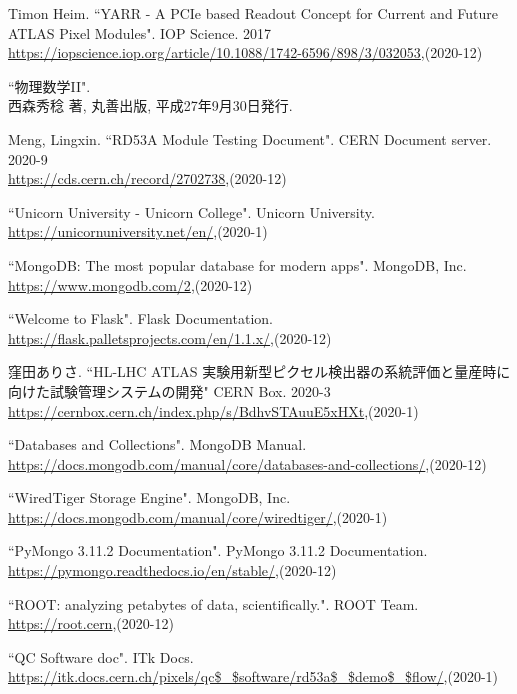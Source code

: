 \begin{thebibliography}{9}
Timon Heim. ``YARR - A PCIe based Readout Concept for Current and Future ATLAS Pixel Modules". IOP Science. 2017\\
\url{https://iopscience.iop.org/article/10.1088/1742-6596/898/3/032053},(2020-12)

``物理数学II".\\
西森秀稔 著, 丸善出版, 平成27年9月30日発行.

Meng, Lingxin. ``RD53A Module Testing Document". CERN Document server. 2020-9\\
\url{https://cds.cern.ch/record/2702738},(2020-12)

``Unicorn University - Unicorn College". Unicorn University.\\
\url{https://unicornuniversity.net/en/},(2020-1)

``MongoDB: The most popular database for modern apps". MongoDB, Inc. \\
\url{https://www.mongodb.com/2},(2020-12)

``Welcome to Flask". Flask Documentation. \\
\url{https://flask.palletsprojects.com/en/1.1.x/},(2020-12)

窪田ありさ. ``HL-LHC ATLAS 実験用新型ピクセル検出器の系統評価と量産時に向けた試験管理システムの開発" CERN Box. 2020-3\\
\url{https://cernbox.cern.ch/index.php/s/BdhvSTAuuE5xHXt},(2020-1)

``Databases and Collections". MongoDB Manual. \\
\url{https://docs.mongodb.com/manual/core/databases-and-collections/},(2020-12)

``WiredTiger Storage Engine". MongoDB, Inc. \\
\url{https://docs.mongodb.com/manual/core/wiredtiger/},(2020-1)

``PyMongo 3.11.2 Documentation". PyMongo 3.11.2 Documentation.\\
\url{https://pymongo.readthedocs.io/en/stable/},(2020-12)

``ROOT: analyzing petabytes of data, scientifically.". ROOT Team.\\ 
\url{https://root.cern},(2020-12)

``QC Software doc". ITk Docs. \\
\url{https://itk.docs.cern.ch/pixels/qc$\_$software/rd53a$\_$demo$\_$flow/},(2020-1)


\end{thebibliography}
